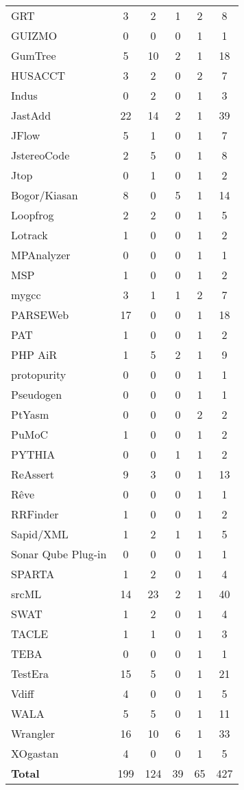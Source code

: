 \begin{longtable}{ l c c c c c }
   GRT & 3 & 2 & 1 & 2 & 8 \\
   GUIZMO & 0 & 0 & 0 & 1 & 1 \\
   GumTree & 5 & 10 & 2 & 1 & 18 \\
   HUSACCT & 3 & 2 & 0 & 2 & 7 \\
   Indus & 0 & 2 & 0 & 1 & 3 \\
   JastAdd & 22 & 14 & 2 & 1 & 39 \\
   JFlow & 5 & 1 & 0 & 1 & 7 \\
   JstereoCode & 2 & 5 & 0 & 1 & 8 \\
   Jtop & 0 & 1 & 0 & 1 & 2 \\
   Bogor/Kiasan & 8 & 0 & 5 & 1 & 14 \\
   Loopfrog & 2 & 2 & 0 & 1 & 5 \\
   Lotrack & 1 & 0 & 0 & 1 & 2 \\
   MPAnalyzer & 0 & 0 & 0 & 1 & 1 \\
   MSP & 1 & 0 & 0 & 1 & 2 \\
   mygcc & 3 & 1 & 1 & 2 & 7 \\
   PARSEWeb & 17 & 0 & 0 & 1 & 18 \\
   PAT & 1 & 0 & 0 & 1 & 2 \\
   PHP AiR & 1 & 5 & 2 & 1 & 9 \\
   protopurity & 0 & 0 & 0 & 1 & 1 \\
   Pseudogen & 0 & 0 & 0 & 1 & 1 \\
   PtYasm & 0 & 0 & 0 & 2 & 2 \\
   PuMoC & 1 & 0 & 0 & 1 & 2 \\
   PYTHIA & 0 & 0 & 1 & 1 & 2 \\
   ReAssert & 9 & 3 & 0 & 1 & 13 \\
   Rêve & 0 & 0 & 0 & 1 & 1 \\
   RRFinder & 1 & 0 & 0 & 1 & 2 \\
   Sapid/XML & 1 & 2 & 1 & 1 & 5 \\
   Sonar Qube Plug-in & 0 & 0 & 0 & 1 & 1 \\
   SPARTA & 1 & 2 & 0 & 1 & 4 \\
   srcML & 14 & 23 & 2 & 1 & 40 \\
   SWAT & 1 & 2 & 0 & 1 & 4 \\
   TACLE & 1 & 1 & 0 & 1 & 3 \\
   TEBA & 0 & 0 & 0 & 1 & 1 \\
   TestEra & 15 & 5 & 0 & 1 & 21 \\
   Vdiff & 4 & 0 & 0 & 1 & 5 \\
   WALA & 5 & 5 & 0 & 1 & 11 \\
   Wrangler & 16 & 10 & 6 & 1 & 33 \\
   XOgastan & 4 & 0 & 0 & 1 & 5 \\
  \hline
  {\bf Total} & 199 & 124 & 39 & 65 & 427 \\
\end{longtable}
